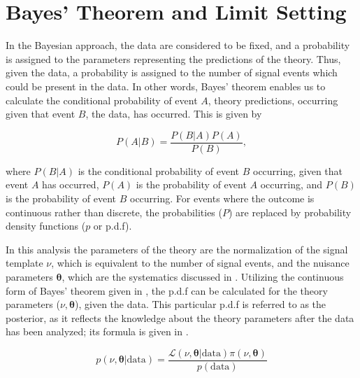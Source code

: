 \section{Bayes' Theorem and Limit Setting} \label{sec:fit:theory}

In the Bayesian approach, the data are considered to be fixed, and a
probability is assigned to the parameters representing the predictions of the
theory. Thus, given the data, a probability is assigned to the number of signal
events which could be present in the data.  In other words, Bayes' theorem
enables us to calculate the conditional probability of event $A$, theory
predictions, occurring given that event $B$, the data, has occurred. This is
given by 

\begin{equation} \label{sec:fit:general_bayes} 
P(A|B) = \frac{P(B|A)P(A)}{P(B)}, 
\end{equation}

where $P(B|A)$ is the conditional probability of event $B$ occurring, given that
event $A$ has occurred, $P(A)$ is the probability of event $A$ occurring, and
$P(B)$ is the probability of event $B$ occurring. For events where the outcome
is continuous rather than discrete, the probabilities ($P$) are replaced by
probability density functions ($p$ or p.d.f).

In this analysis the parameters of the theory are the normalization of the
signal template $\nu$, which is equivalent to the number of signal events, and
the nuisance parameters $\boldsymbol{\theta}$, which are the systematics
discussed in . Utilizing the continuous form of Bayes'
theorem given in , the p.d.f can be calculated for
the theory parameters ($\nu,\boldsymbol{\theta}$), given the data.  This
particular p.d.f is referred to as the posterior, as it reflects the knowledge
about the theory parameters after the data has been analyzed; its formula is given in
.

\begin{equation} \label{eq:fit:posterior}
p(\nu,\boldsymbol{\theta}|\text{data}) = \frac{\mathcal{L}(\nu,\boldsymbol{\theta}|\text{data})\pi(\nu,\boldsymbol{\theta})}{p(\text{data})}
\end{equation}

